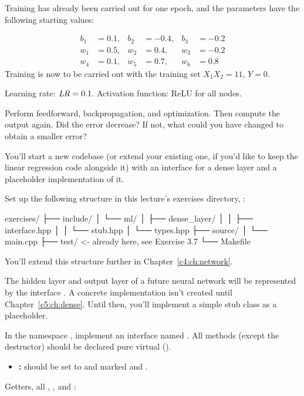 Training has already been carried out for one epoch, and the parameters have the following starting
values:

\begin{align*}
  b_1 &= 0.1, & b_2 &= -0.4, & b_3 &= -0.2 \\
  w_1 &= 0.5, & w_2 &= 0.4, & w_3 &= -0.2 \\
  w_4 &= 0.1, & w_5 &= 0.7, & w_6 &= 0.8
\end{align*}
Training is now to be carried out with the training set $X_1X_2 = 11$, $Y = 0$.

Learning rate: $\mathit{LR} = 0.1$. Activation function: ReLU for all nodes.

Perform feedforward, backpropagation, and optimization. Then compute the output again. Did the
error decrease? If not, what could you have changed to obtain a smaller error?

\label{c3:set:2}
You'll start a new  codebase (or extend your existing one, if you'd like to keep the linear
regression code alongside it) with an interface for a dense layer and a placeholder implementation
of it.

\label{c3:ex:4}
Set up the following structure in this lecture's exercises directory,
:

\begin{console}
exercises/
├── include/
│   └── ml/
│       ├── dense_layer/
│       │   ├── interface.hpp
│       │   └── stub.hpp
│       └── types.hpp
├── source/
│   └── main.cpp
├── test/                <- already here, see Exercise 3.7
└── Makefile
\end{console}

\noindent You'll extend this structure further in Chapter~\ref{c4:ch:network}.

\label{c3:ex:5}
The hidden layer and output layer of a future neural network will be represented by the interface
. A concrete implementation isn't created until
Chapter~\ref{c5:ch:dense}. Until then, you'll implement a simple stub class
 as a placeholder.

In the namespace , implement an interface named . All methods
(except the destructor) should be declared pure virtual ().
\begin{itemize}
  \item \textbf{:} should be set to  and marked  and
    .
\end{itemize}
Getters, all , , and \code{[[nodiscard]]}:


